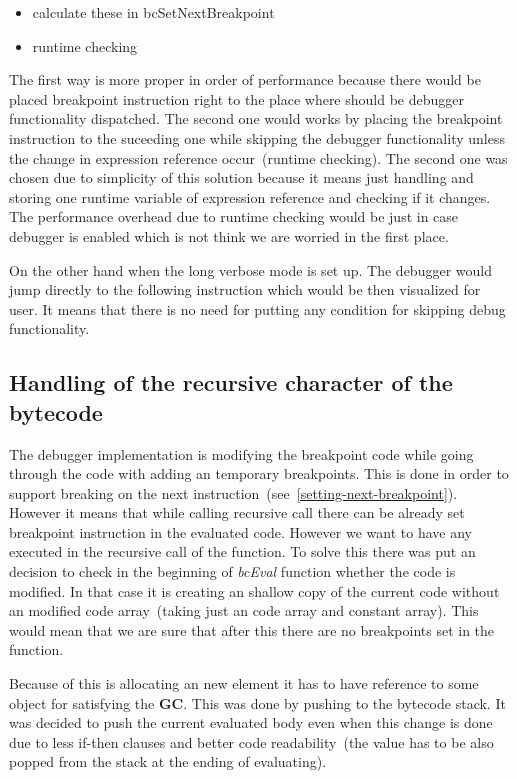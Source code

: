\documentclass[thesis=M,english]{FITthesis}[2018/10/20]
\begin{document}
\begin{itemize}
	\item calculate these in bcSetNextBreakpoint
	\item runtime checking
\end{itemize}

The first way is more proper in order of performance because there would be placed breakpoint instruction right to the place where should be debugger functionality dispatched. The second one would works by placing the breakpoint instruction to the suceeding one while skipping the debugger functionality unless the change in expression reference occur~(runtime checking). The second one was chosen due to simplicity of this solution because it means just handling and storing one runtime variable of expression reference and checking if it changes. The performance overhead due to runtime checking would be just in case debugger is enabled which is not think we are worried in the first place.

On the other hand when the long verbose mode is set up. The debugger would jump directly to the following instruction which would be then visualized for user. It means that there is no need for putting any condition for skipping debug functionality.

\subsection{Handling of the recursive character of the bytecode}

The debugger implementation is modifying the breakpoint code  while going through the code with adding an temporary breakpoints. This is done in order to support breaking on the next instruction~(see~\ref{setting-next-breakpoint}). However it means that while calling recursive call there can be already set breakpoint instruction in the evaluated code. However we want to have any executed in the recursive call of the function. To solve this there was put an decision to check in the beginning of \textit{bcEval} function whether the code is modified. In that case it is creating an shallow copy of the current code without an modified code array~(taking just an code array and constant array). This would mean that we are sure that after this there are no breakpoints set in the function.

Because of this is allocating an new element it has to have reference to some object for satisfying the \textbf{GC}. This was done by pushing to the bytecode stack. It was decided to push the current evaluated body even when this change is done due to less if-then clauses and better code readability~(the value has to be also popped from the stack at the ending of evaluating).
\end{document}
